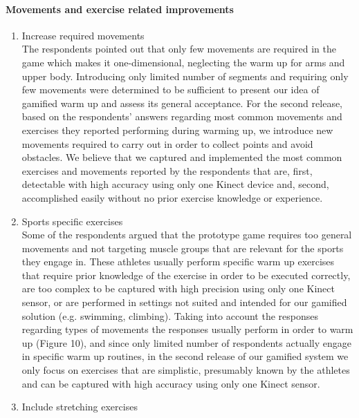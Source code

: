 \paragraph{Movements and exercise related improvements}
\begin{enumerate}
\item Increase required movements\\
The respondents pointed out that only few movements are required in the game which makes it one-dimensional, neglecting the warm up for arms and upper body. Introducing only limited number of segments and requiring only few movements were determined to be sufficient to present our idea of gamified warm up and assess its general acceptance. For the second release, based on the respondents' answers regarding most common movements and exercises they reported performing during warming up, we introduce new movements required to carry out in order to collect points and avoid obstacles. We believe that we captured and implemented the most common exercises and movements reported by the respondents that are, first, detectable with high accuracy using only one Kinect device and, second, accomplished easily without no prior exercise knowledge or experience. %
\item Sports specific exercises\\
Some of the respondents argued that the prototype game requires too general movements and not targeting muscle groups that are relevant for the sports they engage in. These athletes usually perform specific warm up exercises that require prior knowledge of the exercise in order to be executed correctly, are too complex to be captured with high precision using only one Kinect sensor, or are performed in settings not suited and intended for our gamified solution (e.g. swimming, climbing).  Taking into account the responses regarding types of movements the responses usually perform in order to warm up (Figure 10), and since only limited number of respondents actually engage in specific warm up routines, in the second release of our gamified system we only focus on exercises that are simplistic, presumably known by the athletes and can be captured with high accuracy using only one Kinect sensor.
\item Include stretching exercises\\

\end{enumerate}
